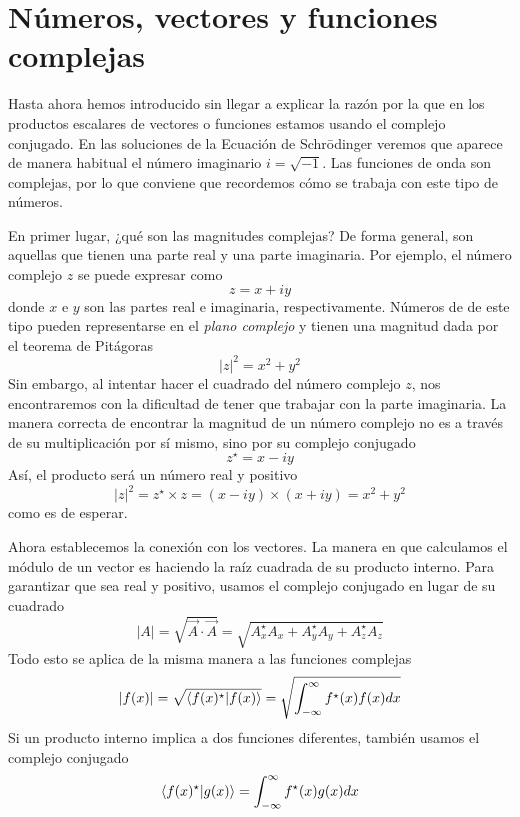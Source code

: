\documentclass{tufte-handout}
\begin{document}
\section{Números, vectores y funciones complejas}
Hasta ahora hemos introducido sin llegar a explicar la razón por la que en los productos
escalares de vectores o funciones estamos usando el complejo conjugado.
En las soluciones de la Ecuación de Schr\=odinger
veremos que aparece de manera habitual el número 
imaginario $i=\sqrt{-1}$. Las funciones de onda
son complejas, por lo que conviene que recordemos cómo se trabaja con este tipo de números.

En primer lugar, ¿qué son las magnitudes complejas?
De forma general, son aquellas que tienen una parte real y una parte imaginaria. Por ejemplo,
el número complejo $z$ se puede expresar como
\begin{equation}
    z= x + iy
\end{equation}
donde $x$ e $y$ son las partes real e imaginaria,
respectivamente. Números de de este tipo pueden
representarse en el \textit{plano complejo} y 
tienen una magnitud dada por el teorema de Pitágoras
\begin{equation}
    |z|^2=x^2+y^2
\end{equation}
Sin embargo, al intentar hacer el cuadrado
del número complejo $z$, nos encontraremos con la 
dificultad de tener que trabajar con la parte
imaginaria. La manera correcta de encontrar 
la magnitud de un número complejo no es
a través de su multiplicación por sí mismo,
sino por su complejo conjugado
\begin{equation}
    z^\star=x-iy
\end{equation}
Así, el producto será un número real y 
positivo
\begin{equation}
    |z|^2=z^\star\times z= (x-iy)\times(x+iy)=x^2+y^2
\end{equation}
como es de esperar. 

Ahora establecemos la conexión con los vectores.
La manera en que calculamos el módulo de un vector
es haciendo la raíz cuadrada de su producto
interno. Para garantizar que sea real y positivo,
usamos el complejo conjugado en lugar de su 
cuadrado
\begin{equation}
    |A|=\sqrt{\vec{A}\cdot\vec{A}}=
    \sqrt{A_x^\star A_x + A_y^\star A_y + A_z^\star A_z}
\end{equation}
Todo esto se aplica de la misma manera a las
funciones complejas
\begin{equation}
    |f(x)|=\sqrt{\braket{f(x)^\star}{f(x)}}=
    \sqrt{\int_{-\infty}^\infty f^\star(x)f(x)dx}
\end{equation}
Si un producto interno implica a dos funciones
diferentes, también usamos el complejo conjugado
\begin{equation}
    \braket{f(x)^\star}{g(x)}=\int_{-\infty}^\infty f^\star(x)g(x)dx
\end{equation}
\end{document}
